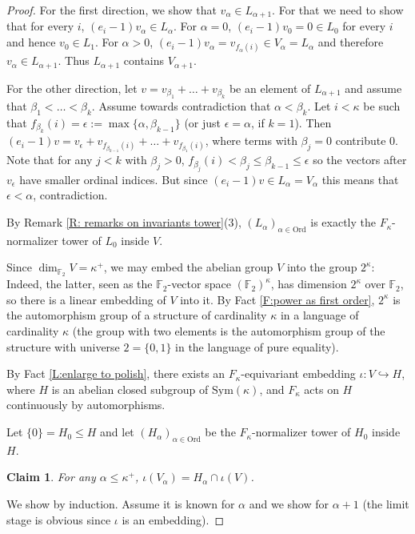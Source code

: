 \documentclass[11pt]{amsart}
\theoremstyle{plain}
\newtheorem{claim}[theorem]{Claim}
\theoremstyle{definition}
\newenvironment{claimproof}[1][\proofname]
  {\proof[#1]\renewcommand*\qedsymbol{$\square$ (claim)}}
  {\endproof}
\newcommand{\FF}{\mathbb{F}}
\begin{document}
\begin{proof}
\begin{claimproof}
        For the first direction, we show that $v_{\alpha}\in L_{\alpha+1}$. For that we need to show that for every $i$, $(e_i-1)v_{\alpha}\in L_\alpha$. For $\alpha=0$, $(e_i-1)v_0=0\in L_0$ for every $i$ and hence $v_0\in L_1$. For $\alpha>0$, $(e_i-1)v_\alpha=v_{f_{\alpha}(i)}\in V_\alpha=L_\alpha$ and therefore $v_\alpha\in L_{\alpha+1}$. Thus $L_{\alpha+1}$ contains $V_{\alpha+1}$.
        
        For the other direction, let $v=v_{\beta_1}+\dots+v_{\beta_k}$ be an element of $L_{\alpha+1}$ and assume that $\beta_1<\dots<\beta_k$. Assume towards contradiction that $\alpha <\beta_{k}$. Let $i<\kappa$ be such that $f_{\beta_k}(i) =\epsilon := \max\{\alpha,\beta_{k-1}\}$ (or just $\epsilon=\alpha$, if $k=1$). Then $(e_i-1) v = v_{\epsilon}+v_{f_{\beta_{k-1}}(i)} +\ldots +v_{f_{\beta_1}(i)}$, where terms with $\beta_j=0$ contribute $0$. Note that for any $j<k$ with $\beta_j>0$, $f_{\beta_j}(i)<\beta_j\leq \beta_{k-1}\leq \epsilon$ so the vectors after $v_{\epsilon}$ have smaller ordinal indices. But since $(e_i -1)v \in L_{\alpha} = V_{\alpha}$ this means that $\epsilon < \alpha$, contradiction.
      
    \end{claimproof}


    By Remark \ref{R: remarks on invariants tower}(3), $(L_\alpha)_{\alpha\in \mathrm{Ord}}$ is exactly the $F_\kappa$-normalizer tower of $L_0$ inside $V$. 
    
    Since $\dim_{\FF_2}V=\kappa^+$, we may embed the abelian group $V$ into the group $2^\kappa$: Indeed, the latter, seen as the $\FF_2$-vector space $(\FF_2)^\kappa$, has dimension $2^{\kappa}$ over $\FF_2$, so there is a linear embedding of $V$ into it. By Fact \ref{F:power as first order},  $2^\kappa$ is the automorphism group of a structure of cardinality $\kappa$ in a language of cardinality $\kappa$ (the group with two elements is the automorphism group of the structure with universe $2=\{0,1\}$ in the language of pure equality).
    
    By Fact \ref{L:enlarge to polish}, there exists an $F_\kappa$-equivariant embedding $\iota:V\hookrightarrow  H$, where $H$ is  an abelian closed subgroup of $\mathrm{Sym}(\kappa)$, and $F_\kappa$ acts on $H$ continuously by automorphisms.

    Let $\{0\}=H_0\leq H$ and let $(H_{\alpha})_{\alpha\in \mathrm{Ord}}$ be the  $F_\kappa$-normalizer tower  of $H_0$ inside $H$.
    
    \begin{claim}
        For any $\alpha\leq \kappa^+$, $\iota(V_\alpha)=H_\alpha\cap \iota(V)$.
    \end{claim}
    \begin{claimproof}
        We show by induction. Assume it is known for $\alpha$ and we show for $\alpha+1$ (the limit stage is obvious since $\iota$ is an embedding).


\end{claimproof}
\end{proof}
\end{document}
